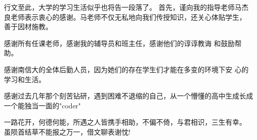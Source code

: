 \documentclass[a4paper]{nuist}
\begin{document}
% 
% 
% 
% 




\thanking
{
行文至此，大学的学习生活似乎也将告一段落了。
首先，谨向我的指导老师马杰良老师表示衷心的感谢。马老师不仅无私地向我们传授知识，还关心体贴学生，
善于因材施教。

感谢所有任课老师，感谢我的辅导员和班主任，感谢他们的谆谆教诲
和鼓励帮助。

感谢南信大的全体后勤人员，因为她们的存在学生们才能在多变的环境下安
心的学习和生活。

感谢过去几年那个刻苦钻研，遇到困难不退缩的自己，从一个懵懂的高中生成长成一个能独当一面的"coder"

一路花开，何德何能，所遇之人皆携手相助，不偏不倚，与君相识，三生有幸。
虽陨首结草不能报之万一，借文聊表谢忱!
}
\end{document}
